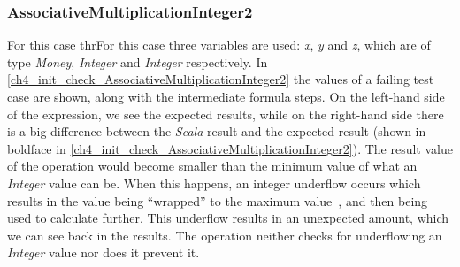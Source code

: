 \subsubsection{AssociativeMultiplicationInteger2}
For this case thrFor this case three variables are used: \textit{x}, \textit{y} and \textit{z},
which are of type \textit{Money}, \textit{Integer} and \textit{Integer}
respectively. In \autoref{ch4_init_check_AssociativeMultiplicationInteger2} the
values of a failing test case are shown, along with the intermediate formula
steps. On the left-hand side of the expression, we see the expected results,
while on the right-hand side there is a big difference between the
\textit{Scala} result and the expected result (shown in boldface in
\autoref{ch4_init_check_AssociativeMultiplicationInteger2}). The result value of
the operation would become smaller than the minimum value of what an
\textit{Integer} value can be. When this happens, an integer underflow occurs
which results in the value being ``wrapped'' to the maximum
value~\cite{brumley2007rich}, and then being used to calculate further. This
underflow results in an unexpected amount, which we can see back in the results.
The operation neither checks for underflowing an \textit{Integer} value nor does
it prevent it.
